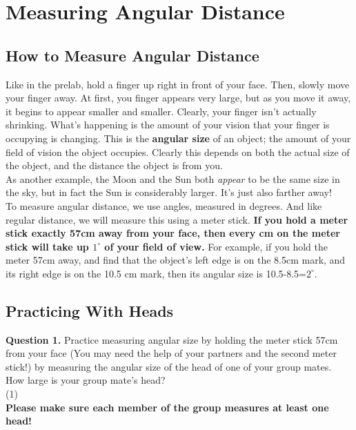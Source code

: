 \documentclass[11pt]{article}
\begin{document}
\newpage

\section{Measuring Angular Distance}

\subsection{How to Measure Angular Distance}
Like in the prelab, hold a finger up right in front of your face. Then, slowly move your finger away. At first, you finger appears very large, but as you move it away, it begins to appear smaller and smaller. Clearly, your finger isn't actually shrinking. What's happening is the amount of your vision that your finger is occupying is changing. This is the \textbf{angular size} of an object; the amount of your field of vision the object occupies. Clearly this depends on both the actual size of the object, and the distance the object is from you.\\

As another example, the Moon and the Sun both \textit{appear} to be the same size in the sky, but in fact the Sun is considerably larger. It's just also farther away!\\

To measure angular distance, we use angles, measured in degrees. And like regular distance, we will measure this using a meter stick. \textbf{If you hold a meter stick exactly 57cm away from your face, then every cm on the meter stick will take up $1^\circ$ of your field of view.} For example, if you hold the meter 57cm away, and find that the object's left edge is on the 8.5cm mark, and its right edge is on the 10.5 cm mark, then its angular size is 10.5-8.5=$2^\circ$.\\

\subsection{Practicing With Heads}

\textbf{Question 1.} Practice measuring angular size by holding the meter stick 57cm from your face (You may need the help of your partners and the second meter stick!) by measuring the angular size of the head of one of your group mates. How large is your group mate's head?\\

\vspace*{1.5cm}
(1) \hrulefill\\
\textbf{Please make sure each member of the group measures at least one head!}
\end{document}
